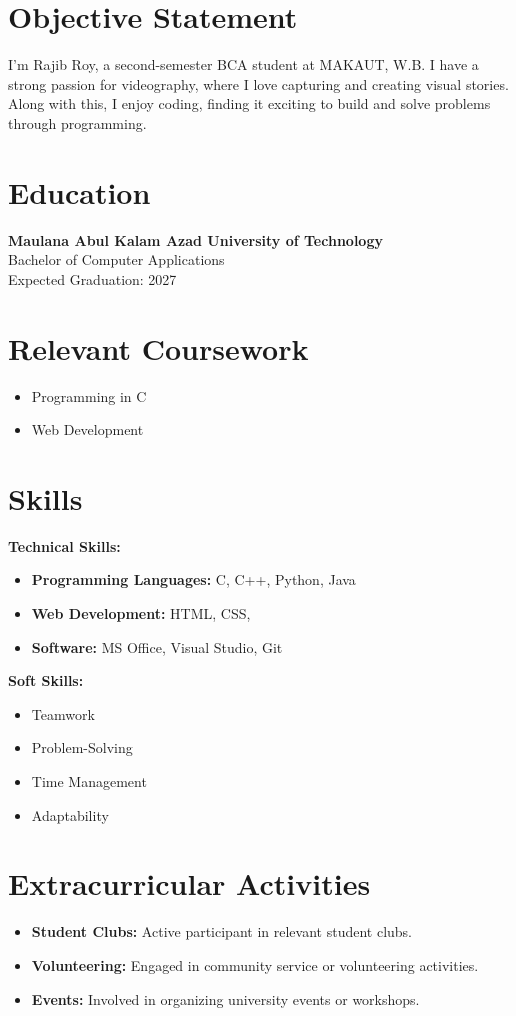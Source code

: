\documentclass{article}
\begin{document}
\section*{Objective Statement}
I’m Rajib Roy, a second-semester BCA student at MAKAUT, W.B. I have a strong passion for videography, where I love capturing and creating visual stories. Along with this, I enjoy coding, finding it exciting to build and solve problems through programming. 
\section*{Education}
\textbf{Maulana Abul Kalam Azad University of Technology} \\
Bachelor of Computer Applications \\
Expected Graduation: 2027

\section*{Relevant Coursework}
\begin{itemize}[left=0pt]
    \item Programming in C 
    \item Web Development
\end{itemize}

\section*{Skills}

\textbf{Technical Skills:}
\begin{itemize}[left=0pt]
    \item \textbf{Programming Languages:} C, C++, Python, Java
    \item \textbf{Web Development:} HTML, CSS, 
    \item \textbf{Software:} MS Office, Visual Studio, Git
\end{itemize}

\textbf{Soft Skills:}
\begin{itemize}[left=0pt]
    \item Teamwork
    \item Problem-Solving
    \item Time Management
    \item Adaptability
\end{itemize}

\section*{Extracurricular Activities}
\begin{itemize}[left=0pt]
    \item \textbf{Student Clubs:} Active participant in relevant student clubs.
    \item \textbf{Volunteering:} Engaged in community service or volunteering activities.
    \item \textbf{Events:} Involved in organizing university events or workshops.
\end{itemize}
\end{document}
